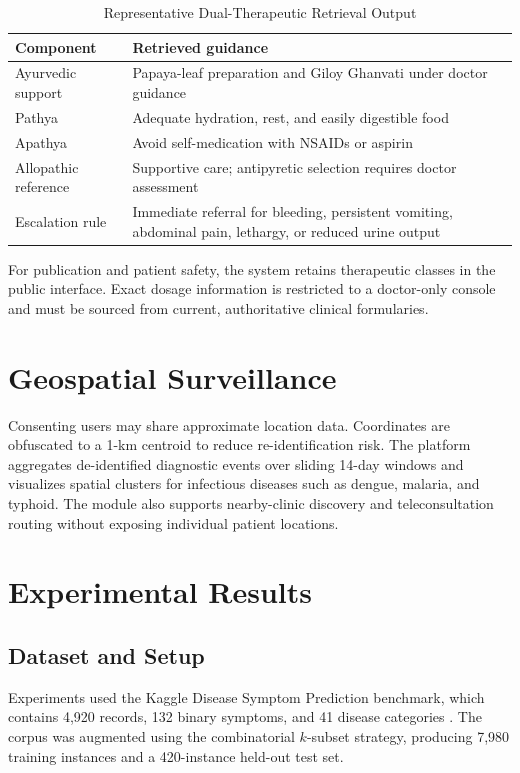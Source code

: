 \documentclass[conference]{IEEEtran}
\begin{document}
\begin{table}[htbp]
\caption{Representative Dual-Therapeutic Retrieval Output}
\label{tab:therapeutic_output}
\centering
\small
\begin{tabularx}{\linewidth}{lX}
\toprule
\textbf{Component} & \textbf{Retrieved guidance} \\
\midrule
Ayurvedic support & Papaya-leaf preparation and Giloy Ghanvati under doctor guidance \\
Pathya & Adequate hydration, rest, and easily digestible food \\
Apathya & Avoid self-medication with NSAIDs or aspirin \\
Allopathic reference & Supportive care; antipyretic selection requires doctor assessment \\
Escalation rule & Immediate referral for bleeding, persistent vomiting, abdominal pain, lethargy, or reduced urine output \\
\bottomrule
\end{tabularx}
\end{table}

For publication and patient safety, the system retains therapeutic classes in the public interface. Exact dosage information is restricted to a doctor-only console and must be sourced from current, authoritative clinical formularies.

\section{Geospatial Surveillance}
Consenting users may share approximate location data. Coordinates are obfuscated to a 1-km centroid to reduce re-identification risk. The platform aggregates de-identified diagnostic events over sliding 14-day windows and visualizes spatial clusters for infectious diseases such as dengue, malaria, and typhoid. The module also supports nearby-clinic discovery and teleconsultation routing without exposing individual patient locations.

\section{Experimental Results}

\subsection{Dataset and Setup}
Experiments used the Kaggle Disease Symptom Prediction benchmark, which contains 4,920 records, 132 binary symptoms, and 41 disease categories \cite{kaggleDataset}. The corpus was augmented using the combinatorial $k$-subset strategy, producing 7,980 training instances and a 420-instance held-out test set.
\end{document}
